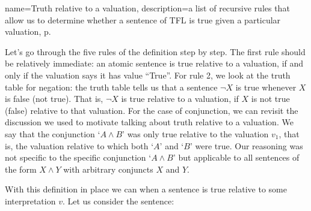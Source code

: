 	
{
name=Truth relative to a valuation,
description={a list of recursive rules that allow us to determine whether a sentence of TFL is true given a particular valuation, p.~\pageref{Truthval}}
}

Let's go through the five rules of the definition step by step. The first rule should be relatively immediate: an atomic sentence is true relative to a valuation, if and only if the valuation says it has value ``True''. For rule 2, we look at the truth table for negation: the truth table tells us that a sentence $\neg X$ is true whenever $X$ is false (not true). That is, $\neg X$ is true relative to a valuation, if $X$ is not true (false) relative to that valuation. For the case of conjunction, we can revisit the discussion we used to motivate talking about truth relative to a valuation. We say that the conjunction `$A\wedge B$' was only true relative to the valuation $v_1$, that is, the valuation relative to which both `$A$' and `$B$' were true. Our reasoning was not specific to the specific conjunction `$A\wedge B$' but applicable to all sentences of the form $X\wedge Y$ with arbitrary conjuncts $X$ and $Y$.

With this definition in place we can when a sentence is true relative to some interpretation $v$. Let us consider the sentence:


